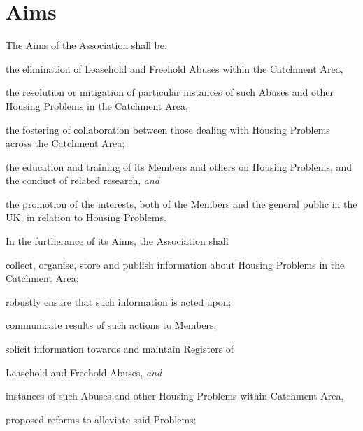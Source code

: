 \documentclass[12pt]{article}
\newcommand{\LAFA}[0]{Leasehold and Freehold Abuses}
\newcommand{\ITand}[0]{\textit{and}}
\begin{document}

\section{Aims}
\begin{constenum}

\item The Aims of the Association shall be:

  \begin{constenum}

  \item the elimination of \LAFA{} within the Catchment Area,

  \item the resolution or mitigation of particular instances of such
    Abuses and other Housing Problems in the Catchment Area,

  \item the fostering of collaboration between those dealing with
    Housing Problems across the Catchment Area;

  \item the education and training of its Members and others on
    Housing Problems, and the conduct of related research, \ITand

  \item the promotion of the interests, both of the Members and the
    general public in the UK, in relation to Housing Problems.

  \end{constenum}

\item In the furtherance of its Aims, the Association shall
\begin{constenum}

  \item collect, organise, store and publish information about
    Housing Problems in the Catchment Area;

  \item robustly ensure that such information is acted upon;

  \item communicate results of such actions to Members;

  \item solicit information towards and maintain Registers of
    \begin{constenum}
    \item \LAFA, \ITand
    \item instances of such Abuses and other Housing Problems within
      Catchment Area,
    \item proposed reforms to alleviate said Problems;
    \end{constenum}


\end{constenum}
\end{constenum}
\end{document}
